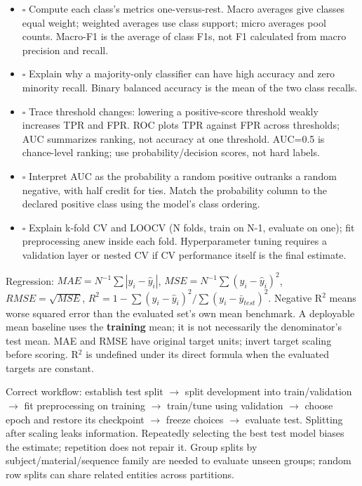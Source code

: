 \documentclass[11pt]{article}
\begin{document}
\begin{itemize}
\item \(\square\) Compute each class's metrics one-versus-rest. Macro averages give classes equal weight; weighted averages use class support; micro averages pool counts. Macro-F1 is the average of class F1s, not F1 calculated from macro precision and recall.
\item \(\square\) Explain why a majority-only classifier can have high accuracy and zero minority recall. Binary balanced accuracy is the mean of the two class recalls.
\item \(\square\) Trace threshold changes: lowering a positive-score threshold weakly increases TPR and FPR. ROC plots TPR against FPR across thresholds; AUC summarizes ranking, not accuracy at one threshold. AUC=0.5 is chance-level ranking; use probability/\allowbreak{}decision scores, not hard labels.
\item \(\square\) Interpret AUC as the probability a random positive outranks a random negative, with half credit for ties. Match the probability column to the declared positive class using the model's class ordering.
\item \(\square\) Explain k-fold CV and LOOCV (N folds, train on N-1, evaluate on one); fit preprocessing anew inside each fold. Hyperparameter tuning requires a validation layer or nested CV if CV performance itself is the final estimate.
\end{itemize}

Regression: $MAE=N^{-1}\sum|y_i-\hat y_i|$, $MSE=N^{-1}\sum(y_i-\hat y_i)^2$, $RMSE=\sqrt{MSE}$, $R^2=1-\sum(y_i-\hat y_i)^2/\sum(y_i-\bar y_{test})^2$. Negative R\ensuremath{{}^2} means worse squared error than the evaluated set's own mean benchmark. A deployable mean baseline uses the \textbf{training} mean; it is not necessarily the denominator's test mean. MAE and RMSE have original target units; invert target scaling before scoring. R\ensuremath{{}^2} is undefined under its direct formula when the evaluated targets are constant.

Correct workflow: establish test split \ensuremath{\rightarrow} split development into train/\allowbreak{}validation \ensuremath{\rightarrow} fit preprocessing on training \ensuremath{\rightarrow} train/\allowbreak{}tune using validation \ensuremath{\rightarrow} choose epoch and restore its checkpoint \ensuremath{\rightarrow} freeze choices \ensuremath{\rightarrow} evaluate test. Splitting after scaling leaks information. Repeatedly selecting the best test model biases the estimate; repetition does not repair it. Group splits by subject/\allowbreak{}material/\allowbreak{}sequence family are needed to evaluate unseen groups; random row splits can share related entities across partitions.
\end{document}
